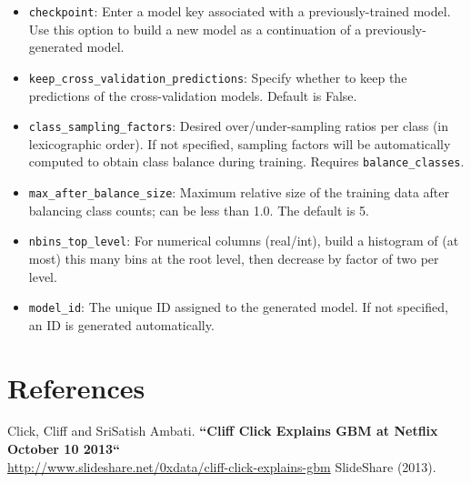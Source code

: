 \begin{itemize}
\item {\texttt{checkpoint}}: Enter a model key associated with a previously-trained model. Use this option to build a new model as a continuation of a previously-generated model.
\item {\texttt{keep\_cross\_validation\_predictions}}: Specify whether to keep the predictions of the cross-validation models.   Default is False.
\item {\texttt{class\_sampling\_factors}}: Desired over/under-sampling ratios per class (in lexicographic order). If not specified, sampling factors will be automatically computed to obtain class balance during training. Requires \texttt{balance\_classes}.
\item {\texttt{max\_after\_balance\_size}}: Maximum relative size of the training data after balancing class counts; can be less than 1.0.  The default is 5.
\item {\texttt{nbins\_top\_level}}: For numerical columns (real/int), build a histogram of (at most) this many bins at the root level, then decrease by factor of two per level.
\item \texttt{model\_id}: The unique ID assigned to the generated model. If not specified, an ID is generated automatically.
\end{itemize}



\newpage

\section{References}

Click, Cliff and SriSatish Ambati. {\textbf{``Cliff Click Explains GBM at Netflix October 10 2013``}}\\
 \url{http://www.slideshare.net/0xdata/cliff-click-explains-gbm} SlideShare (2013).

\medskip

